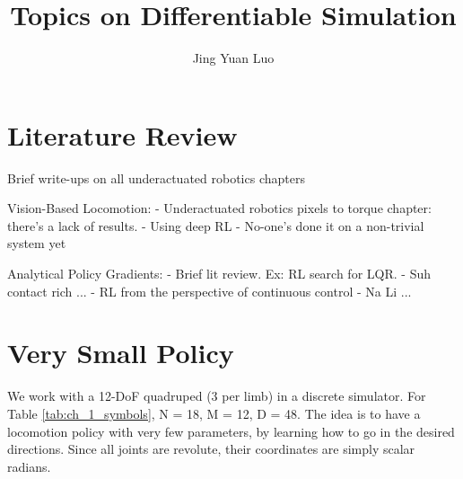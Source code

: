\documentclass{article}
\title{Topics on Differentiable Simulation}
\author{Jing Yuan Luo}
\begin{document}
\maketitle

\section{Literature Review}

Brief write-ups on all underactuated robotics chapters \cite{featherstoneRigidBodyDynamics2008} \cite{jacksonPlanningAttitude2021}

Vision-Based Locomotion:
- Underactuated robotics pixels to torque chapter: there's a lack of results.
- Using deep RL
- No-one's done it on a non-trivial system yet

Analytical Policy Gradients:
- Brief lit review. Ex: RL search for LQR.
- Suh contact rich ...
- RL from the perspective of continuous control
- Na Li ...

\section{Very Small Policy}
\label{ch_1}
We work with a 12-DoF quadruped (3 per limb) in a discrete simulator. For Table \ref{tab:ch_1_symbols}, N = 18, M = 12, D = 48. The idea is to have a locomotion policy with very few parameters, by learning how to go in the desired directions. Since all joints are revolute, their coordinates are simply scalar radians.
\end{document}
